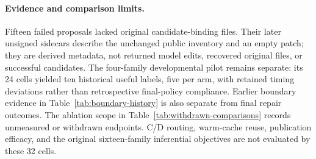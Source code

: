 \paragraph{Evidence and comparison limits.}
Fifteen failed proposals lacked original candidate-binding files. Their later
unsigned sidecars describe the unchanged public inventory and an empty patch;
they are derived metadata, not returned model edits, recovered original files,
or successful candidates. The four-family developmental pilot remains separate:
its 24 cells yielded ten historical useful labels, five per arm, with retained
timing deviations rather than retrospective final-policy compliance.
Earlier boundary evidence in Table~\ref{tab:boundary-history} is also separate
from final repair outcomes. The ablation scope in
Table~\ref{tab:withdrawn-comparisons} records unmeasured or withdrawn endpoints.
C/D routing, warm-cache reuse, publication efficacy, and the original
sixteen-family inferential objectives are not evaluated by these 32 cells.
